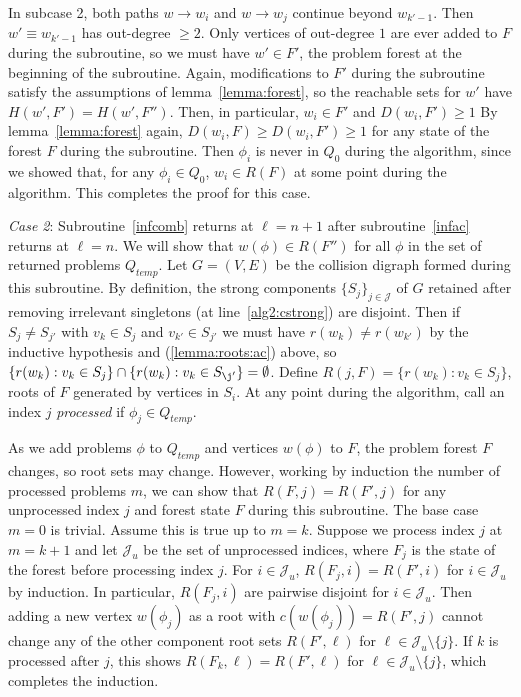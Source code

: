 \documentclass[11pt,reqno]{amsart}
\theoremstyle{definition}
\numberwithin{equation}{section}
\newcommand{\pre}{\phi}
\newcommand{\strongcomp}{S}
\newcommand{\acto}{Q_0}
\newcommand{\actt}{Q_{temp}}
\newcommand{\reach}{H}
\newcommand{\forest}{F}
\newcommand{\roott}{R}
\newcommand{\depth}{D}
\newcommand{\unproc}{\mathcal{J}_u}
\begin{document}
\begin{enumerate}
In subcase 2, both paths $w \to w_i$ and $w \to w_j$ continue beyond $w_{k'-1}$.
Then $w' \equiv w_{k' - 1}$ has out-degree $\geq 2$.
Only vertices of out-degree $1$ are ever added to $\forest$ during the subroutine, so we must have $w' \in \forest'$, the problem forest at the beginning of the subroutine.
Again, modifications to $\forest'$ during the subroutine satisfy the assumptions of lemma~\ref{lemma:forest}, so the reachable sets for $w'$ have $\reach(w',\forest') = \reach(w',\forest'')$.  
Then, in particular, $w_i \in \forest'$ and $\depth(w_i, \forest') \geq 1$
By lemma~\ref{lemma:forest} again, $\depth(w_i, \forest) \geq \depth(w_i, \forest') \geq 1$  for any state of the forest $\forest$ during the subroutine. 
Then $\pre_i$ is never in $\acto$ during the algorithm, since we showed that, for any $\pre_i \in \acto$, $w_i \in \roott(\forest)$ at some point during the algorithm. 
This completes the proof for this case.

\emph{Case 2}: Subroutine~\ref{infcomb} returns at $\ell = n +1$ after subroutine~\ref{infac} returns at $\ell = n$. 
We will show that $w(\pre) \in \roott(\forest'')$ for all $\pre$ in the set of returned problems $\actt$.
Let $G = (V,E)$ be the collision digraph formed during this subroutine.
By definition, the strong components $\{\strongcomp_j\}_{j \in \mathcal{J}}$ of $G$ retained after removing irrelevant singletons (at line~\ref{alg2:cstrong}) are disjoint. 
Then if $\strongcomp_j \not = \strongcomp_{j'}$ with $v_k \in \strongcomp_j$ and $v_{k'} \in \strongcomp_{j'}$ we must have $r(w_k) \not = r(w_{k'})$ by the inductive hypothesis and (\ref{lemma:roots:ac}) above, so $\{r(w_k): v_k \in \strongcomp_j\} \cap \{r(w_k): v_k \in \strongcomp_{\j'}\} = \emptyset$. 
Define $R(j,\forest) = \{r(w_k): v_k \in \strongcomp_j\}$, roots of $\forest$ generated by vertices in $\strongcomp_i$. 
At any point during the algorithm, call an index $j$ \emph{processed} if $\pre_j \in \actt$.

As we add problems $\pre$ to $\actt$ and vertices $w(\pre)$ to $\forest$, the problem forest $\forest$ changes, so root sets may change. 
However, working by induction the number of processed problems $m$, we can show that $R(\forest,j) = R(\forest',j)$ for any unprocessed index $j$ and forest state $\forest$ during this subroutine.
The base case $m = 0$ is trivial. 
Assume this is true up to $m = k$. 
Suppose we process index $j$ at $m = k+1$ and let $\unproc$ be the set of unprocessed indices, where $\forest_j$ is the state of the forest before processing index $j$. 
For $i \in \unproc$, $R(\forest_j,i) = R(\forest',i)$ for $i \in \unproc$ by induction.
In particular, $R(\forest_j,i)$ are pairwise disjoint for $i \in \unproc$.
Then adding a new vertex $w(\pre_j)$ as a root with $c(w(\pre_j)) = R(\forest',j)$ cannot change any of the other component root sets $R(\forest', \ell)$ for $\ell \in \unproc \setminus \{j\}$.
If $k$ is processed after $j$, this shows $R(\forest_k,\ell) = R(\forest',\ell)$ for $\ell \in \unproc \setminus \{j\}$, which completes the induction. 


\end{enumerate}
\end{document}
